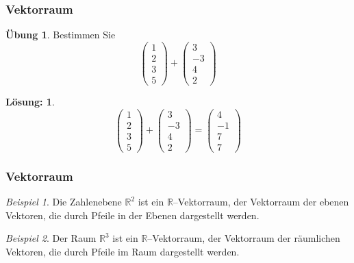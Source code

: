 \documentclass[hyperref={pdfpagelabels=false}]{beamer}
\theoremstyle{plain}%
\theoremstyle{definition}
\newtheorem*{uebung}{Übung}
\newtheorem*{sol}{Lösung:}
\theoremstyle{remark}
\newtheorem*{beispiel}{Beispiel}
\def \R{\mathbb R}
\begin{document}
\begin{frame}
\frametitle{Vektorraum}

\begin{uebung}
Bestimmen Sie 
  	$$ \left( \begin{matrix} 1 \\ 2 \\ 3 \\5  \end{matrix} \right) 
	+ \left( \begin{matrix} 3 \\  - 3 \\ 4 \\  2 \end{matrix} \right) $$
\end{uebung}

\pause \pause 

\begin{sol}
  	$$ \left( \begin{matrix} 1 \\ 2 \\ 3 \\5  \end{matrix} \right) 
	+ \left( \begin{matrix} 3 \\  - 3 \\ 4 \\  2 \end{matrix} \right) 
	= \left( \begin{matrix} 4 \\ -1 \\ 7 \\ 7  \end{matrix} \right) $$

\end{sol}

\end{frame}


\begin{frame}
\frametitle{Vektorraum}

\begin{beispiel} Die Zahlenebene $\R^2$ ist ein $\R$--Vektorraum, der Vektorraum der ebenen Vektoren, die 
durch Pfeile in der Ebenen dargestellt werden. 
\end{beispiel}

\pause 

\bigbreak

\begin{beispiel}
Der Raum $\R^3$ ist ein $\R$--Vektorraum, der Vektorraum der räumlichen Vektoren, die 
durch Pfeile im Raum dargestellt werden.
\end{beispiel}

\end{frame}
\end{document}
